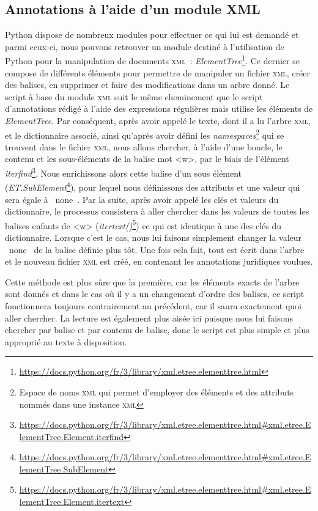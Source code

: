 \subsection{Annotations à l'aide d'un module XML}
Python dispose de nombreux modules pour effectuer ce qui lui est demandé et parmi ceux-ci, nous pouvons retrouver un module destiné à l’utilisation de Python pour la manipulation de documents \textsc{xml}~: \emph{ElementTree}\footnote{\url{https://docs.python.org/fr/3/library/xml.etree.elementtree.html}}. Ce dernier se compose de différents éléments pour permettre de manipuler un fichier \textsc{xml}, créer des balises, en supprimer et faire des modifications dans un arbre donné.  Le script à base du module \textsc{xml} suit le même cheminement que le script d’annotations rédigé à l’aide des expressions régulières mais utilise les éléments de \emph{ElementTree}. Par conséquent, après avoir appelé le texte, dont il a lu l’arbre \textsc{xml}, et le dictionnaire associé, ainsi qu’après avoir défini les \textit{namespaces}\footnote{Espace de noms \textsc{xml} qui permet d'employer des éléments et des attributs nommés dans une instance \textsc{xml}} qui se trouvent dans le fichier \textsc{xml}, nous allons chercher, à l’aide d’une boucle, le contenu et les sous-éléments de la balise mot <w>, par le biais de l’élément \textit{iterfind}\footnote{\url{https://docs.python.org/fr/3/library/xml.etree.elementtree.html\#xml.etree.ElementTree.Element.iterfind}}. Nous enrichissons alors cette balise d'un sous élément (\textit{ET.SubElement}\footnote{\url{https://docs.python.org/fr/3/library/xml.etree.elementtree.html\#xml.etree.ElementTree.SubElement}}), pour lequel nous définissons des attributs et une valeur qui sera égale à \og~none~\fg{}. Par la suite, après avoir appelé les clés et valeurs du dictionnaire, le processus consistera à aller chercher dans les valeurs de toutes les balises enfants de <w> (\textit{itertext()}\footnote{\url{https://docs.python.org/fr/3/library/xml.etree.elementtree.html\#xml.etree.ElementTree.Element.itertext}}) ce qui est identique à une des clés du dictionnaire. Lorsque c’est le cas, nous lui faisons simplement changer la valeur \og~none~\fg{} de la balise définie plus tôt. Une fois cela fait, tout est écrit dans l’arbre et le nouveau fichier \textsc{xml} est créé, en contenant les annotations juridiques voulues. 

Cette méthode est plus sûre que la première, car les éléments exacts de l’arbre sont donnés et dans le cas où il y a un changement d’ordre des balises, ce script fonctionnera toujours contrairement au précédent, car il saura exactement quoi aller chercher. La lecture est également plus aisée ici puisque nous lui faisons chercher par balise et par contenu de balise, donc le script est plus simple et plus approprié au texte à disposition.

